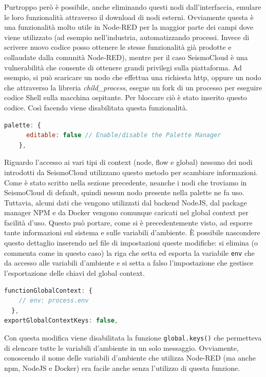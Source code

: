 \documentclass[a4paper,10pt]{memoir}
\begin{document}
Purtroppo però è possibile, anche eliminando questi nodi dall'interfaccia, emulare le loro funzionalità attraverso il download di nodi esterni.
Ovviamente questa è una funzionalità molto utile in Node-RED per la maggior parte dei campi dove viene utilizzato (ad esempio nell'industria, automatizzando processi. Invece di scrivere nuovo codice posso ottenere le stesse funzionalità già prodotte e collaudate dalla comunità Node-RED), mentre per il caso SeismoCloud è una vulnerabilità che consente di ottenere grandi privilegi sulla piattaforma.
Ad esempio, si può scaricare un nodo che effettua una richiesta http, oppure un nodo che attraverso la libreria \textit{child\_process}, esegue un fork di un processo per eseguire codice Shell sulla macchina ospitante. Per bloccare ciò è stato inserito questo codice. Così facendo viene disabilitata questa funzionalità.
\begin{lstlisting}[language=Javascript, firstnumber=93]
    palette: {
      editable: false // Enable/disable the Palette Manager
    },
\end{lstlisting}

Riguardo l'accesso ai vari tipi di context (node, flow e global) nessuno dei nodi introdotti da SeismoCloud utilizzano questo metodo per scambiare informazioni.
Come è stato scritto nella sezione precedente, neanche i nodi che troviamo in SeismoCloud di default, quindi nessun nodo presente nella palette ne fa uso.
Tuttavia, alcuni dati che vengono utilizzati dal backend NodeJS, dal package manager NPM e da Docker vengono comunque caricati nel global context per facilità d'uso. Questo può portare, come si è precedentemente visto, ad esporre tante informazioni sul sistema e sulle variabili d'ambiente.
È possibile nascondere questo dettaglio inserendo nel file di impostazioni queste modifiche: si elimina (o commenta come in questo caso) la riga che setta ed esporta la variabile \texttt{env} che da accesso alle variabili d'ambiente e si setta a falso l'impostazione che gestisce l'esportazione delle chiavi del global context. 
\begin{lstlisting}[language=Javascript, firstnumber=56]
functionGlobalContext: {
    // env: process.env
  },
exportGlobalContextKeys: false,
\end{lstlisting}
Con questa modifica viene disabilitata la funzione \texttt{global.keys()} che permetteva di elencare tutte le variabili d'ambiente in un solo messaggio.
Ovviamente, conoscendo il nome delle variabili d'ambiente che utilizza Node-RED (ma anche npm, NodeJS e Docker) era facile anche senza l'utilizzo di questa funzione.
\end{document}
